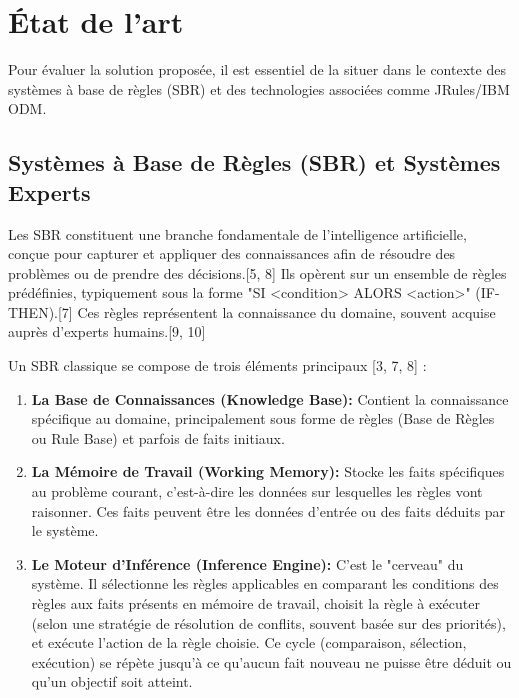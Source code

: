 \documentclass[11pt,a4paper]{article}
\begin{document}
\section{État de l'art}
\label{sec:etat_art}

Pour évaluer la solution proposée, il est essentiel de la situer dans le contexte des systèmes à base de règles (SBR) et des technologies associées comme JRules/IBM ODM.

\subsection{Systèmes à Base de Règles (SBR) et Systèmes Experts}

Les SBR constituent une branche fondamentale de l'intelligence artificielle, conçue pour capturer et appliquer des connaissances afin de résoudre des problèmes ou de prendre des décisions.[5, 8] Ils opèrent sur un ensemble de règles prédéfinies, typiquement sous la forme "SI <condition> ALORS <action>" (IF-THEN).[7] Ces règles représentent la connaissance du domaine, souvent acquise auprès d'experts humains.[9, 10]

Un SBR classique se compose de trois éléments principaux [3, 7, 8] :
\begin{enumerate}
    \item \textbf{La Base de Connaissances (Knowledge Base):} Contient la connaissance spécifique au domaine, principalement sous forme de règles (Base de Règles ou Rule Base) et parfois de faits initiaux.
    \item \textbf{La Mémoire de Travail (Working Memory):} Stocke les faits spécifiques au problème courant, c'est-à-dire les données sur lesquelles les règles vont raisonner. Ces faits peuvent être les données d'entrée ou des faits déduits par le système.
    \item \textbf{Le Moteur d'Inférence (Inference Engine):} C'est le "cerveau" du système. Il sélectionne les règles applicables en comparant les conditions des règles aux faits présents en mémoire de travail, choisit la règle à exécuter (selon une stratégie de résolution de conflits, souvent basée sur des priorités), et exécute l'action de la règle choisie. Ce cycle (comparaison, sélection, exécution) se répète jusqu'à ce qu'aucun fait nouveau ne puisse être déduit ou qu'un objectif soit atteint.
\end{enumerate}
\end{document}
